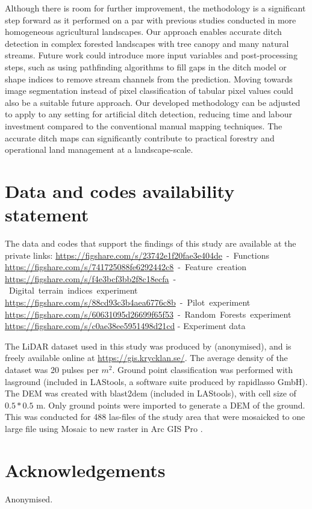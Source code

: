 \documentclass[]{interact}
\theoremstyle{plain}%
\theoremstyle{definition}
\theoremstyle{remark}
\begin{document}
Although there is room for further improvement, the methodology is a significant step forward as it performed on a par with previous studies conducted in more homogeneous agricultural landscapes. Our approach enables accurate ditch detection in complex forested landscapes with tree canopy and many natural streams. Future work could introduce more input variables and post-processing steps, such as using pathfinding algorithms to fill gaps in the ditch model or shape indices to remove stream channels from the prediction. Moving towards image segmentation instead of pixel classification of tabular pixel values could also be a suitable future approach. Our developed methodology can be adjusted to apply to any setting for artificial ditch detection, reducing time and labour investment compared to the conventional manual mapping techniques. The accurate ditch maps can significantly contribute to practical forestry and operational land management at a landscape-scale.


\section*{Data and codes availability statement}
The data and codes that support the findings of this study are available at the private links:\newline
\mbox{\href{https://figshare.com/s/23742e1f20fae3e404de}{https://figshare.com/s/23742e1f20fae3e404de} - Functions\itshape\ignorespaces}
\mbox{\href{https://figshare.com/s/741725088fe6292442c8}{https://figshare.com/s/741725088fe6292442c8} - Feature creation\itshape\ignorespaces}
\mbox{\href{https://figshare.com/s/f4e3bcf3bb2f8c18ecfa}{https://figshare.com/s/f4e3bcf3bb2f8c18ecfa} - Digital terrain indices experiment\itshape\ignorespaces}
\mbox{\href{https://figshare.com/s/88cd93c3b4aea6776c8b}{https://figshare.com/s/88cd93c3b4aea6776c8b} - Pilot experiment\itshape\ignorespaces}
\mbox{\href{https://figshare.com/s/60631095d26699f65f53}{https://figshare.com/s/60631095d26699f65f53} - Random Forests experiment\itshape\ignorespaces}
\mbox{\href{https://figshare.com/s/c0ae38ee5951498d21cd}{https://figshare.com/s/c0ae38ee5951498d21cd}} - Experiment data

\label{lidartodem}
The LiDAR dataset used in this study was produced by (anonymised), and is freely available online at \href{https://gis.krycklan.se/}{https://gis.krycklan.se/}. The average density of the dataset was 20 pulses per $m^2$.  Ground point classification was performed with lasground (included in LAStools, a software suite produced by rapidlasso GmbH). The DEM was created with blast2dem (included in LAStools),  with cell size of $0.5*0.5$ m. Only ground points were imported  to generate a DEM of the ground. This was conducted for 488 las-files of the study area that were mosaicked to one large file using Mosaic to new raster in Arc GIS Pro \citep{EsriArcGisBook}.

\section*{Acknowledgements}
Anonymised.



\label{references}



\end{document}
